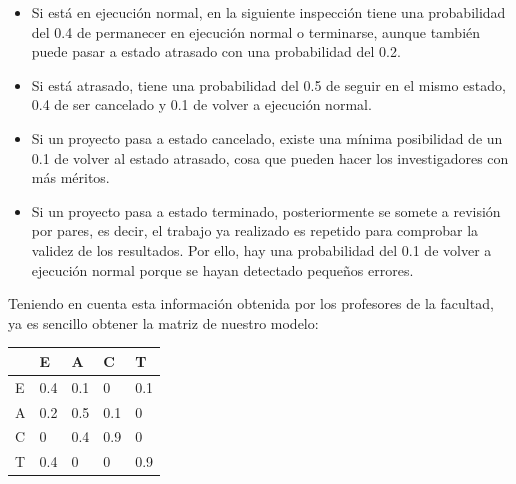 \documentclass[10pt,a4paper]{article}
\begin{document}
\begin{itemize}
	\item Si está en ejecución normal, en la siguiente inspección tiene una probabilidad del 0.4 de permanecer en ejecución normal o terminarse, aunque también puede pasar a estado atrasado con una probabilidad del 0.2.
	\item Si está atrasado, tiene una probabilidad del 0.5 de seguir en el mismo estado, 0.4 de ser cancelado y 0.1 de volver a ejecución normal.
	\item Si un proyecto pasa a estado cancelado, existe una mínima posibilidad de un 0.1 de volver al estado atrasado, cosa que pueden hacer los investigadores con más méritos.
	\item Si un proyecto pasa a estado terminado, posteriormente se somete a revisión por pares, es decir, el trabajo ya realizado es repetido para comprobar la validez de los resultados. Por ello, hay una probabilidad del 0.1 de volver a ejecución normal porque se hayan detectado pequeños errores.
\end{itemize}

Teniendo en cuenta esta información obtenida por los profesores de la facultad, ya es sencillo obtener la matriz de nuestro modelo:

\begin{table}[h]
	\begin{center}
	\begin{tabular}{l|l|l|l|l|}
		\cline{2-5}
		& E   & A   & C & T \\ \hline
		\multicolumn{1}{|l|}{E} & 0.4 & 0.1 & 0 & 0.1 \\ \hline
		\multicolumn{1}{|l|}{A} & 0.2 & 0.5 & 0.1 & 0 \\ \hline
		\multicolumn{1}{|l|}{C} & 0   & 0.4 & 0.9 & 0 \\ \hline
		\multicolumn{1}{|l|}{T} & 0.4 & 0   & 0 & 0.9 \\ \hline
	\end{tabular}
\end{center}
\end{table}
\end{document}
